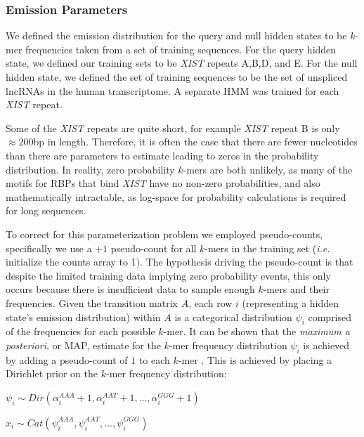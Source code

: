 \subsubsection{Emission Parameters}
We defined the emission distribution for the query and null hidden states to be $k$-mer frequencies taken from a set of training sequences. For the query hidden state, we defined our training sets to be \emph{XIST} repeats A,B,D, and E. For the null hidden state, we defined the set of training sequences to be the set of unspliced lncRNAs in the human transcriptome. A separate HMM was trained for each \emph{XIST} repeat. 

Some of the \emph{XIST} repeats are quite short, for example \emph{XIST} repeat B is only $\approx 200$bp in length. Therefore, it is often the case that there are fewer nucleotides than there are parameters to estimate leading to zeros in the probability distribution. In reality, zero probability $k$-mers are both unlikely, as many of the motifs for RBPs that bind \emph{XIST} have no non-zero probabilities, and also mathematically intractable, as log-space for probability calculations is required for long sequences.

To correct for this parameterization problem we employed pseudo-counts, specifically we use a $+1$ pseudo-count for all $k$-mers in the training set (\emph{i.e.} initialize the counts array to 1). The hypothesis driving the pseudo-count is that despite the limited training data implying zero probability events, this only occurs because there is insufficient data to sample enough $k$-mers and their frequencies. Given the transition matrix $A$, each row $i$ (representing a hidden state's emission distribution) within $A$ is a categorical distribution $\psi_i $ comprised of the frequencies for each possible $k$-mer. It can be shown that the \emph{maximum a posteriori}, or MAP, estimate for the $k$-mer frequency distribution $\psi_i$ is achieved by adding a pseudo-count of $1$ to each $k$-mer \cite{Rabiner1989ARecognition}. This is achieved by placing a Dirichlet prior on the $k$-mer frequency distribution:

\begin{center}
    $\psi_i \sim Dir(\alpha_i^{AAA}+1,\alpha_i^{AAT}+1,\dots,\alpha_i^{GGG}+1)$
    
    $x_i \sim Cat(\psi_i^{AAA},\psi_i^{AAT},\dots,\psi_i^{GGG})$
\end{center}

